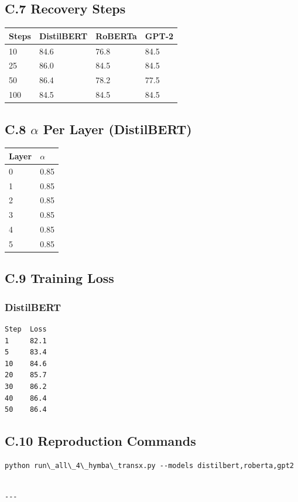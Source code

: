 \subsection{C.7 Recovery Steps}

\begin{table}[H]
\centering
\small
\begin{tabular}{llll}
\toprule
\textbf{Steps} & \textbf{DistilBERT} & \textbf{RoBERTa} & \textbf{GPT-2} \\
\midrule
10 & 84.6 & 76.8 & 84.5 \\
25 & 86.0 & 84.5 & 84.5 \\
50 & 86.4 & 78.2 & 77.5 \\
100 & 84.5 & 84.5 & 84.5 \\
\bottomrule
\end{tabular}
\end{table}

\subsection{C.8 $\alpha$ Per Layer (DistilBERT)}

\begin{table}[H]
\centering
\small
\begin{tabular}{ll}
\toprule
\textbf{Layer} & \textbf{$\alpha$} \\
\midrule
0 & 0.85 \\
1 & 0.85 \\
2 & 0.85 \\
3 & 0.85 \\
4 & 0.85 \\
5 & 0.85 \\
\bottomrule
\end{tabular}
\end{table}

\subsection{C.9 Training Loss}

\subsubsection{DistilBERT}
\begin{lstlisting}
Step  Loss
1     82.1
5     83.4
10    84.6
20    85.7
30    86.2
40    86.4
50    86.4
\end{lstlisting}

\subsection{C.10 Reproduction Commands}

\begin{lstlisting}
python run\_all\_4\_hymba\_transx.py --models distilbert,roberta,gpt2
\end{lstlisting}
\begin{lstlisting}

---
\end{lstlisting}